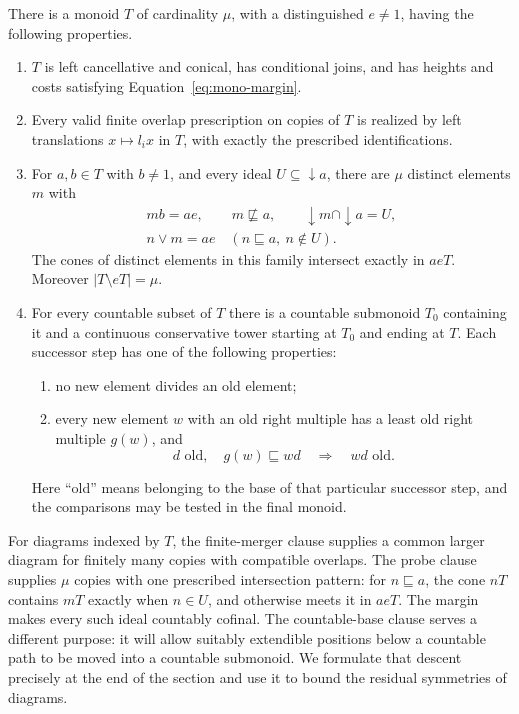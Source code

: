 \begin{theorem}\label{thm:monoid}
There is a monoid $T$ of cardinality $\mu$, with a distinguished
$e\ne1$, having the following properties.
\begin{enumerate}
\item $T$ is left cancellative and conical, has conditional joins,
and has heights and costs satisfying Equation~\eqref{eq:mono-margin}.
\item Every valid finite overlap prescription on copies of $T$ is
realized by left translations $x\mapsto l_i x$ in $T$, with exactly
the prescribed identifications.
\item For $a,b\in T$ with $b\ne1$, and every ideal
$U\subseteq\downarrow a$, there are $\mu$ distinct elements $m$ with
\begin{equation}\label{eq:mono-probes}
 \begin{gathered}
 mb=ae,\qquad m\not\sqsubseteq a,\qquad
 \downarrow m\cap\downarrow a=U,\\
 n\vee m=ae\quad(n\sqsubseteq a,\ n\notin U).
 \end{gathered}
\end{equation}
The cones of distinct elements in this family intersect exactly in
$aeT$.  Moreover $|T\setminus eT|=\mu$.
\item For every countable subset of $T$ there is a countable
submonoid $T_0$ containing it and a continuous conservative tower
starting at $T_0$ and ending at $T$.  Each successor step has one of
the following properties:
\begin{enumerate}
\item no new element divides an old element;
\item every new element $w$ with an old right multiple has a least
old right multiple $g(w)$, and
\begin{equation}\label{eq:mono-gate-old}
 d\text{ old},\quad g(w)\sqsubseteq wd
       \quad\Longrightarrow\quad wd\text{ old}.
\end{equation}
\end{enumerate}
Here ``old'' means belonging to the base of that particular successor
step, and the comparisons may be tested in the final monoid.
\end{enumerate}
\end{theorem}

For diagrams indexed by $T$, the finite-merger clause supplies a common
larger diagram for finitely many copies with compatible overlaps.  The
probe clause supplies $\mu$ copies with one prescribed intersection
pattern: for $n\sqsubseteq a$, the cone $nT$ contains $mT$ exactly when
$n\in U$, and otherwise meets it in $aeT$.  The margin makes every such
ideal countably cofinal.  The countable-base clause serves a different
purpose: it will allow suitably extendible positions below a countable
path to be moved into a countable submonoid.  We formulate that descent
precisely at the end of the section and use it to bound the residual
symmetries of diagrams.

